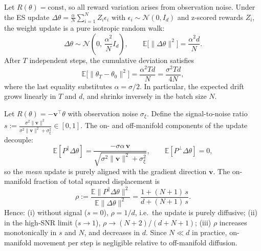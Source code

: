 
\begin{proposition} \label{prop:flat_landscape_scaling}
    Let $R(\theta) = \text{const}$, so all reward variation arises from
    observation noise. Under the ES update
    $\Delta\theta = \frac{\alpha}{N}\sum_{i=1}^N Z_i \epsilon_i$
    with $\epsilon_i \sim \mathcal{N}(0, I_d)$ and z-scored rewards
    $Z_i$, the weight update is a pure isotropic random walk:
    \[
        \Delta\theta \sim \mathcal{N}\!\left(0,\, \frac{\alpha^2}{N} I_d\right),
        \qquad
        \mathbb{E}\bigl[\|\Delta\theta\|^2\bigr] = \frac{\alpha^2 d}{N}.
    \]
    After $T$ independent steps, the cumulative deviation satisfies
    \[
        \mathbb{E}\bigl[\|\theta_T - \theta_0\|^2\bigr]
        = \frac{\alpha^2 T d}{N}
        = \frac{\sigma^2 T d}{4N},
    \]
    where the last equality substitutes $\alpha = \sigma/2$.
    In particular, the expected drift grows linearly in $T$ and $d$,
    and shrinks inversely in the batch size $N$.
    \end{proposition}
    
    
    \begin{proposition} \label{prop:linear_landscape_step}
    Let $R(\theta) = -\mathbf{v}^\top\theta$ with observation noise
    $\sigma_\xi$. Define the signal-to-noise ratio
    $s := \frac{\sigma^2\|\mathbf{v}\|^2}{\sigma^2\|\mathbf{v}\|^2 + \sigma_\xi^2} \in [0,1]$.
    The on- and off-manifold components of the update decouple:
    \[
        \mathbb{E}[P^{\parallel}\Delta\theta]
        = \frac{-\sigma\alpha\,\mathbf{v}}{\sqrt{\sigma^2\|\mathbf{v}\|^2+\sigma_\xi^2}},
        \qquad
        \mathbb{E}[P^{\perp}\Delta\theta] = 0,
    \]
    so the \emph{mean} update is purely aligned with the gradient direction
    $\mathbf{v}$. The on-manifold fraction of total squared displacement is
    \[
        \rho :=
        \frac{\mathbb{E}\|P^{\parallel}\Delta\theta\|^2}
             {\mathbb{E}\|\Delta\theta\|^2}
        =
        \frac{1 + (N+1)\,s}
             {d + (N+1)\,s}.
    \]
    Hence: (i) without signal ($s=0$), $\rho = 1/d$, i.e.\ the update is
    purely diffusive; (ii) in the high-SNR limit ($s\to 1$), $\rho \to
    (N+2)/(d+N+1)$; (iii) $\rho$ increases monotonically in $s$ and $N$,
    and decreases in $d$. Since $N \ll d$ in practice, on-manifold movement
    per step is negligible relative to off-manifold diffusion.
    \end{proposition}
    
